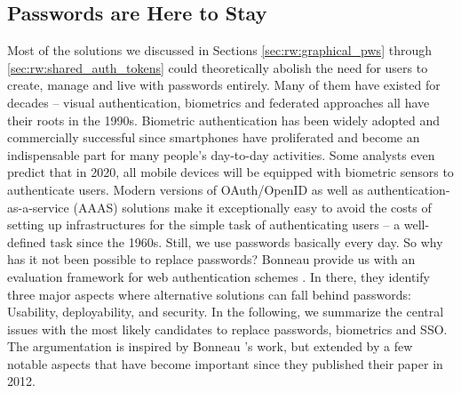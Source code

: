 \subsection{Passwords are Here to Stay}\label{sec:rw:pws_are_here_to_stay}
Most of the solutions we discussed in Sections \ref{sec:rw:graphical_pws} through \ref{sec:rw:shared_auth_tokens} could theoretically abolish the need for users to create, manage and live with passwords entirely. Many of them have existed for decades -- visual authentication, biometrics and federated approaches all have their roots in the 1990s. Biometric authentication has been widely adopted and commercially successful since smartphones have proliferated and become an indispensable part for many people's day-to-day activities. Some analysts even predict that in 2020, all mobile devices will be equipped with biometric sensors to authenticate users. Modern versions of OAuth/OpenID as well as authentication-as-a-service (AAAS) solutions make it exceptionally easy to avoid the costs of setting up infrastructures for the simple task of authenticating users -- a well-defined task since the 1960s. Still, we use passwords basically every day. So why has it not been possible to replace passwords? Bonneau \etal provide us with an evaluation framework for web authentication schemes \cite{Bonneau2012ReplacePasswords}. In there, they identify three major aspects where alternative solutions can fall behind passwords: Usability, deployability, and security. In the following, we summarize the central issues with the most likely candidates to replace passwords, biometrics and SSO. The argumentation is inspired by Bonneau \etal's work, but extended by a few notable aspects that have become important since they published their paper in 2012. 

